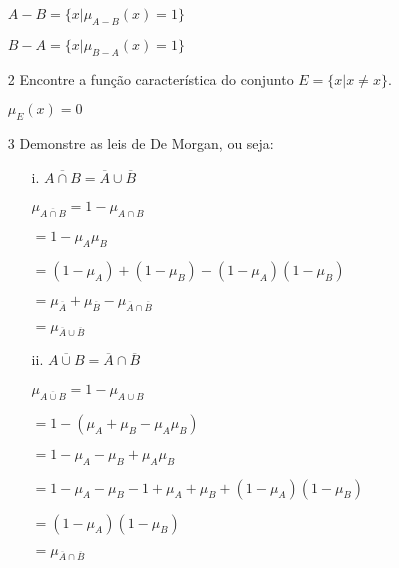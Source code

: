 \documentclass{report}
\begin{document}
\begin{enumerate}
$A - B = \lbrace x \vert \mu_{A - B }(x) = 1 \rbrace$

$B - A = \lbrace x \vert \mu_{B - A }(x) = 1 \rbrace$

\item[2] Encontre a função característica do conjunto $E = \{ x | x \neq x \}$.

$ \mu_E(x) = 0$ 

\item[3] Demonstre as leis de De Morgan, ou seja:

\begin{enumerate}
    \item[i.] $\overline{A \cap B} = \overline{A} \cup \overline{B}$

    $\mu_{\overline{A \cap B}} = 1 - \mu_{A \cap B} $
    
\hspace{0.9 cm}    $ = 1 - \mu_A \mu_B$

 \hspace{0.9 cm}   $ = (1 - \mu_A) + (1 - \mu_B) - (1 - \mu_A)(1-\mu_B)$

 \hspace{0.9 cm}   $ = \mu_{\overline{A}} + \mu_{\overline{B}} - \mu_{\overline{A}\cap\overline{B}}$

\hspace{0.9 cm}  $ = \mu_{\overline{A}\cup\overline{B}} $ 

    \item[ii.] $\overline{A \cup B} = \overline{A} \cap \overline{B}$

    $\mu_{\overline{A \cup B}} = 1 - \mu_{A \cup B} $
    
\hspace{0.9 cm}    $ = 1 - (\mu_A + \mu_B - \mu_A \mu_B)$

\hspace{0.9 cm}    $ = 1 - \mu_A - \mu_B + \mu_A \mu_B$

\hspace{0.9 cm}    $ = 1 - \mu_A - \mu_B - 1 + \mu_A + \mu_B + (1-\mu_A)(1-\mu_B)$

\hspace{0.9 cm}    $ = (1-\mu_A)(1-\mu_B)$

\hspace{0.9 cm}  $ = \mu_{\overline{A}\cap\overline{B}} $ 



\end{enumerate}
\end{enumerate}
\end{document}
